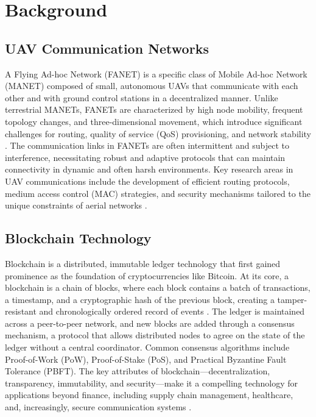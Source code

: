 \section{Background}
\label{sec:background}

\subsection{UAV Communication Networks}

A Flying Ad-hoc Network (FANET) is a specific class of Mobile Ad-hoc Network (MANET) composed of small, autonomous UAVs that communicate with each other and with ground control stations in a decentralized manner. Unlike terrestrial MANETs, FANETs are characterized by high node mobility, frequent topology changes, and three-dimensional movement, which introduce significant challenges for routing, quality of service (QoS) provisioning, and network stability \cite{hafeez2023blockchain}. The communication links in FANETs are often intermittent and subject to interference, necessitating robust and adaptive protocols that can maintain connectivity in dynamic and often harsh environments. Key research areas in UAV communications include the development of efficient routing protocols, medium access control (MAC) strategies, and security mechanisms tailored to the unique constraints of aerial networks \cite{luo2023escm}.

\subsection{Blockchain Technology}

Blockchain is a distributed, immutable ledger technology that first gained prominence as the foundation of cryptocurrencies like Bitcoin. At its core, a blockchain is a chain of blocks, where each block contains a batch of transactions, a timestamp, and a cryptographic hash of the previous block, creating a tamper-resistant and chronologically ordered record of events \cite{jagatheesaperumal2023blockchain}. The ledger is maintained across a peer-to-peer network, and new blocks are added through a consensus mechanism, a protocol that allows distributed nodes to agree on the state of the ledger without a central coordinator. Common consensus algorithms include Proof-of-Work (PoW), Proof-of-Stake (PoS), and Practical Byzantine Fault Tolerance (PBFT). The key attributes of blockchain—decentralization, transparency, immutability, and security—make it a compelling technology for applications beyond finance, including supply chain management, healthcare, and, increasingly, secure communication systems \cite{hossain2024blockchain}.
